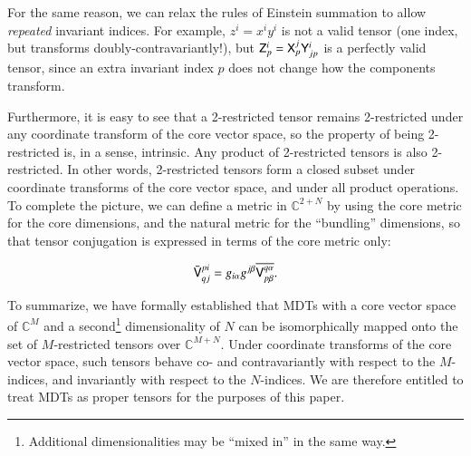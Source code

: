 \documentclass[]{aa}
\begin{document}
For the same reason, we can relax the rules of Einstein summation to allow \emph{repeated} invariant indices. For example, $z^i = x^i y^i$ is not a valid tensor (one index, but transforms doubly-contravariantly!), but $\mathsf{Z}^i_p = \mathsf{X}^j_p \mathsf{Y}^i_{jp}$ is a perfectly valid tensor, since an extra invariant index $p$ does not change how the components transform. 

Furthermore, it is easy to see that a 2-restricted tensor remains 2-restricted under any coordinate transform of the core vector space, so the property of being 2-restricted is, in a sense, intrinsic. Any product of 2-restricted tensors is also 2-restricted. In other words, 2-restricted tensors form a closed subset under coordinate transforms of the core vector space, and under all product operations. To complete the picture, we can define a metric in $\mathbb{C}^{2+N}$ by using the core metric for the core dimensions, and the natural metric for the ``bundling'' dimensions, so that tensor conjugation is expressed in terms of the core metric only:

\[
  \bar{\mathsf{V}}^{pi}_{qj} = g_{i\alpha}g^{j\beta} \overline{ {\mathsf{V}}_{p\beta}^{q\alpha} }.
\]


To summarize, we have formally established that MDTs with a core vector space of $\mathbb{C}^M$ and a second\footnote{Additional dimensionalities may be ``mixed in'' in the same way.} dimensionality of $N$ can be isomorphically mapped onto the set of $M$-restricted tensors over $\mathbb{C}^{M+N}$. Under coordinate transforms of the core vector space, such tensors behave co- and contravariantly with respect to the $M$-indices, and invariantly with respect to the $N$-indices. We are therefore entitled to treat MDTs as proper tensors for the purposes of this paper.





\end{document}

